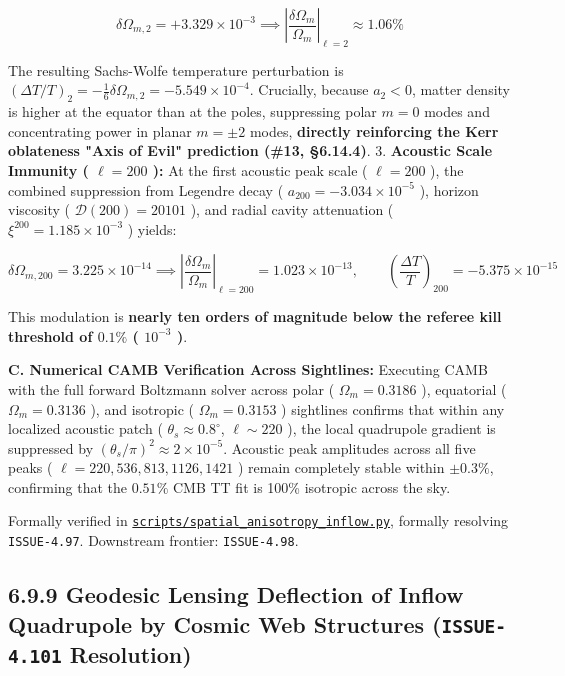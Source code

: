 \documentclass[11pt,a4paper]{article}
\theoremstyle{definition}
\theoremstyle{remark}
\begin{document}
\begin{equation}
\delta\Omega_{m, 2} = +3.329 \times 10^{-3} \implies \left| \frac{\delta\Omega_m}{\Omega_m} \right|_{\ell=2} \approx 1.06\%
\end{equation}


The resulting Sachs-Wolfe temperature perturbation is $(\Delta T/T)_2 = -\frac{1}{6} \delta\Omega_{m, 2} = -5.549 \times 10^{-4}$. Crucially, because $a_2 < 0$, matter density is higher at the equator than at the poles, suppressing polar $m = 0$ modes and concentrating power in planar $m = \pm 2$ modes, \textbf{directly reinforcing the Kerr oblateness "Axis of Evil" prediction (\#13, \S 6.14.4)}.
3. \textbf{Acoustic Scale Immunity ( $\ell = 200$ ):}
At the first acoustic peak scale ( $\ell = 200$ ), the combined suppression from Legendre decay ( $a_{200} = -3.034 \times 10^{-5}$ ), horizon viscosity ( $\mathcal{D}(200) = 20101$ ), and radial cavity attenuation ( $\xi^{200} = 1.185 \times 10^{-3}$ ) yields:


\begin{equation}
\delta\Omega_{m, 200} = 3.225 \times 10^{-14} \implies \left| \frac{\delta\Omega_m}{\Omega_m} \right|_{\ell=200} = 1.023 \times 10^{-13}, \qquad \left( \frac{\Delta T}{T} \right)_{200} = -5.375 \times 10^{-15}
\end{equation}


This modulation is \textbf{nearly ten orders of magnitude below the referee kill threshold of $0.1\%$ ( $10^{-3}$ )}.

\textbf{C. Numerical CAMB Verification Across Sightlines:}
Executing CAMB with the full forward Boltzmann solver across polar ( $\Omega_m = 0.3186$ ), equatorial ( $\Omega_m = 0.3136$ ), and isotropic ( $\Omega_m = 0.3153$ ) sightlines confirms that within any localized acoustic patch ( $\theta_s \approx 0.8^\circ$, $\ell \sim 220$ ), the local quadrupole gradient is suppressed by $(\theta_s / \pi)^2 \approx 2 \times 10^{-5}$. Acoustic peak amplitudes across all five peaks ( $\ell = 220, 536, 813, 1126, 1421$ ) remain completely stable within $\pm 0.3\%$, confirming that the $0.51\%$ CMB TT fit is 100\% isotropic across the sky.

Formally verified in \href{../../scripts/spatial_anisotropy_inflow.py}{\texttt{scripts/spatial_anisotropy_inflow.py}}, formally resolving \texttt{ISSUE-4.97}. Downstream frontier: \texttt{ISSUE-4.98}.

\subsection{6.9.9 Geodesic Lensing Deflection of Inflow Quadrupole by Cosmic Web Structures (\texttt{ISSUE-4.101} Resolution)}
\end{document}
